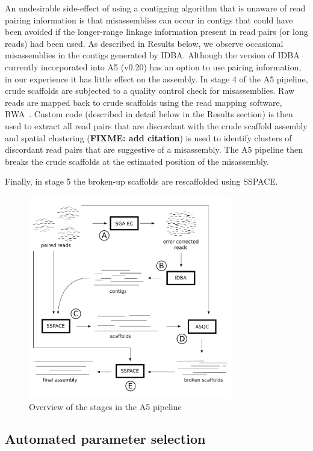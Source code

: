 \documentclass{bioinfo}
\begin{document}
\begin{methods}
An undesirable side-effect of using a contigging algorithm that is unaware of read pairing information is that misassemblies can occur in contigs that could have been avoided if the longer-range linkage information present in read pairs (or long reads) had been used.  As described in Results below, we observe occasional misassemblies in the contigs generated by IDBA. Although the version of IDBA currently incorporated into A5 (v0.20) has an option to use pairing information, in our experience it has little effect on the assembly. In stage 4 of the A5 pipeline, crude scaffolds are subjected to a quality control check for misassemblies. Raw reads are mapped back to crude scaffolds using the read mapping software,
BWA~\citep{bwa}. Custom code (described in detail below in the Results section) is then used to extract all read pairs that are discordant with the crude scaffold assembly and spatial clustering (\textbf{FIXME: add citation}) is used to identify clusters of discordant read pairs that are suggestive of a misassembly. The A5 pipeline then breaks the crude scaffolds at the estimated position of the misassembly.

Finally, in stage 5 the broken-up scaffolds are rescaffolded using SSPACE.
\end{methods}


\begin{figure}[t]
\includegraphics[width=3.5in]{a5pipeline-diagram.pdf}
\vspace{-1cm}
\caption{Overview of the stages in the A5 pipeline}\label{fig:01}
\end{figure}

\subsection{Automated parameter selection}
\end{document}
